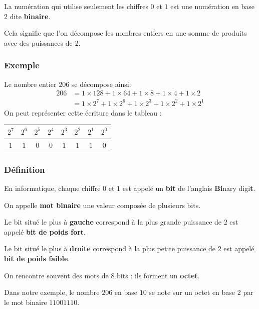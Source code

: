 \documentclass[11pt]{article}
\begin{document}
La numération qui utilise seulement les chiffres \(0\) et \(1\) est une
numération en base \(2\) dite \textbf{binaire}.

Cela signifie que l'on décompose les nombres entiers en une somme de
produits avec des puissances de \(2\).

\hypertarget{exemple}{%
\subsubsection*{Exemple}\label{exemple}}

Le nombre entier \(206\) se décompose ainsi: \begin{align*}
206 &= 1 \times 128 + 1 \times 64 + 1 \times 8 + 1 \times 4 + 1 \times 2 \\
\phantom{206} &= 1 \times 2^{7} + 1 \times 2^{6} + 1 \times 2^{3} + 1 \times 2^{2} + 1 \times 2^{1}
\end{align*} On peut représenter cette écriture dans le tableau :

\begin{longtable}[]{@{}cccccccc@{}}
\toprule
\(2^{7}\) & \(2^{6}\) & \(2^{5}\) & \(2^{4}\) & \(2^{3}\) & \(2^{2}\) &
\(2^{1}\) & \(2^{0}\)\tabularnewline
\midrule
\endhead
\(1\) & \(1\) & \(0\) & \(0\) & \(1\) & \(1\) & \(1\) &
\(0\)\tabularnewline
\bottomrule
\end{longtable}

    \hypertarget{duxe9finition}{%
\subsubsection*{Définition}\label{duxe9finition}}

En informatique, chaque chiffre \(0\) et \(1\) est appelé un
\textbf{bit} de l'anglais \textbf{Bi}nary digi\textbf{t}.

On appelle \textbf{mot binaire} une valeur composée de plusieurs bits.

Le bit situé le plus à \textbf{gauche} correspond à la plus grande
puissance de \(2\) est appelé \textbf{bit de poids fort}.

Le bit situé le plus à \textbf{droite} correspond à la plus petite
puissance de \(2\) est appelé \textbf{bit de poids faible}.

On rencontre souvent des mots de 8 bits : ils forment un \textbf{octet}.

Dans notre exemple, le nombre \(206\) en base \(10\) se note sur un
octet en base \(2\) par le mot binaire \(11001110\).
\end{document}

